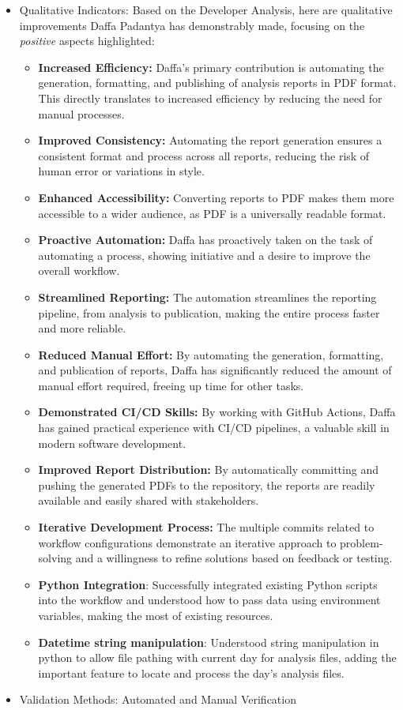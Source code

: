 \documentclass{article}
\begin{document}
\begin{itemize}
\begin{itemize}
        \item Qualitative Indicators: Based on the Developer Analysis, here are qualitative improvements Daffa Padantya has demonstrably made, focusing on the \textit{positive} aspects highlighted:

\begin{itemize}
    \item \textbf{Increased Efficiency:} Daffa's primary contribution is automating the generation, formatting, and publishing of analysis reports in PDF format. This directly translates to increased efficiency by reducing the need for manual processes.
    \item \textbf{Improved Consistency:} Automating the report generation ensures a consistent format and process across all reports, reducing the risk of human error or variations in style.
    \item \textbf{Enhanced Accessibility:} Converting reports to PDF makes them more accessible to a wider audience, as PDF is a universally readable format.
    \item \textbf{Proactive Automation:} Daffa has proactively taken on the task of automating a process, showing initiative and a desire to improve the overall workflow.
    \item \textbf{Streamlined Reporting:} The automation streamlines the reporting pipeline, from analysis to publication, making the entire process faster and more reliable.
    \item \textbf{Reduced Manual Effort:} By automating the generation, formatting, and publication of reports, Daffa has significantly reduced the amount of manual effort required, freeing up time for other tasks.
    \item \textbf{Demonstrated CI/CD Skills:} By working with GitHub Actions, Daffa has gained practical experience with CI/CD pipelines, a valuable skill in modern software development.
    \item \textbf{Improved Report Distribution:} By automatically committing and pushing the generated PDFs to the repository, the reports are readily available and easily shared with stakeholders.
     \item \textbf{Iterative Development Process:}\textit{} The multiple commits related to workflow configurations demonstrate an iterative approach to problem-solving and a willingness to refine solutions based on feedback or testing.
    \item \textbf{Python Integration}: Successfully integrated existing Python scripts into the workflow and understood how to pass data using environment variables, making the most of existing resources.
    \item \textbf{Datetime string manipulation}: Understood string manipulation in python to allow file pathing with current day for analysis files, adding the important feature to locate and process the day's analysis files.

\end{itemize}
 \item Validation Methods: Automated and Manual Verification
\end{itemize}
\end{itemize}
\end{document}

